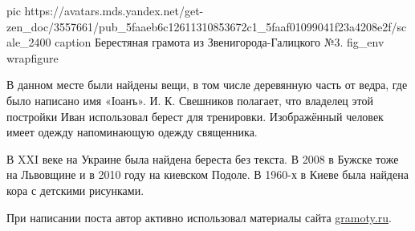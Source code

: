 \ifcmt
  pic https://avatars.mds.yandex.net/get-zen_doc/3557661/pub_5faaeb6c12611310853672c1_5faaf01099041f23a4208e2f/scale_2400
  caption Берестяная грамота из Звенигорода-Галицкого №3.
	fig_env wrapfigure
\fi

В данном месте были найдены вещи, в том числе деревянную часть от ведра, где
было написано имя «Іоанъ». И. К. Свешников полагает, что владелец этой
постройки Иван использовал берест для тренировки. Изображённый человек имеет
одежду напоминающую одежду священника.

В XXI веке на Украине была найдена береста без текста. В 2008 в Бужске тоже на
Львовщине и в 2010 году на киевском Подоле. В 1960-х в Киеве была найдена кора
с детскими рисунками.

При написании поста автор активно использовал материалы сайта \url{gramoty.ru}.
